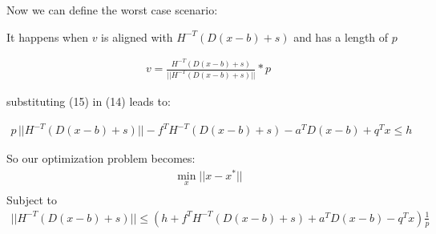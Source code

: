 \documentclass[a4paper]{article}
\begin{document}
\begin{Large}
\pagebreak
Now we can define the worst case scenario:

It happens when $v$ is aligned with $ H^{-T} (D (x-b) +s)$ and has a length of $p$

\begin{align}
    v = \frac{H^{-T} (D (x-b) +s)}{||H^{-T} (D (x-b) +s)||} * p
\end{align}

substituting (15) in (14) leads to:

\begin{align}
    p \,||H^{-T} (D (x-b) +s)|| - f^T H^{-T} (D (x-b)+s) - a^T D (x-b)+ q^T x  \leq h
\end{align}

So our optimization problem becomes:
\begin{align*}
    \min_x || x - x^* || \\
\end{align*}
Subject to
\begin{align*}
        ||H^{-T} (D (x-b) +s)|| \leq (h + f^T H^{-T} (D (x-b)+s)+ a^T D (x-b)- q^T x) \frac{1}{p}
\end{align*}
\end{Large}
\end{document}
